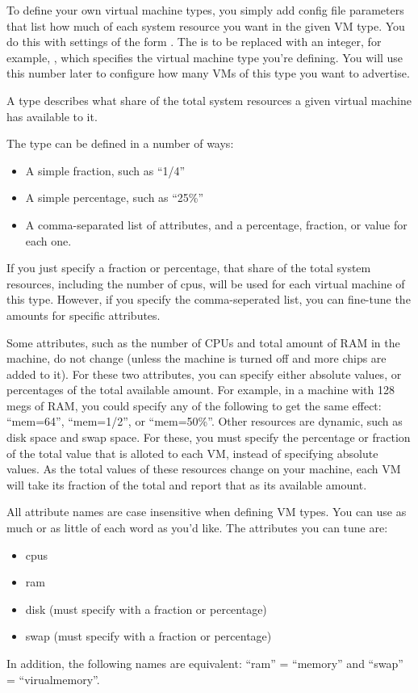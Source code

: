 To define your own virtual machine types, you simply add config file
parameters that list how much of each system resource you want in the
given VM type.  You do this with settings of the form
.
The  is to be replaced with an integer, for example, 
, which specifies the virtual 
machine type you're defining.
You will use this number later to configure how many VMs of this type
you want to advertise.

A type describes what share of the total system resources a given
virtual machine has available to it.

The type can be defined in a number of ways:
\begin{itemize}
  \item A simple fraction, such as ``1/4''
  \item A simple percentage, such as ``25\%''
  \item A comma-separated list of attributes, and a percentage,
	fraction, or value for each one.
\end{itemize}
If you just specify a fraction or percentage, that share of the total
system resources, including the number of cpus, will be used for each
virtual machine of this type.
However, if you specify the comma-seperated list, you can fine-tune
the amounts for specific attributes.

Some attributes, such as the number of CPUs and total amount of RAM in
the machine, do not change (unless the machine is turned off and more
chips are added to it).
For these two attributes, you can specify either absolute values, or
percentages of the total available amount.  
For example, in a machine with 128 megs of RAM, you could specify any
of the following to get the same effect: ``mem=64'', ``mem=1/2'', or
``mem=50\%''.
Other resources are dynamic, such as disk space and swap space.
For these, you must specify the percentage or fraction of the total
value that is alloted to each VM, instead of specifying absolute values.
As the total values of these resources change on your machine, each
VM will take its fraction of the total and report that as its
available amount.

All attribute names are case insensitive when defining VM types.
You can use as much or as little of each word as you'd like.
The attributes you can tune are:
\begin{itemize}
  \item cpus
  \item ram
  \item disk (must specify with a fraction or percentage)
  \item swap (must specify with a fraction or percentage)
\end{itemize}
In addition, the following names are equivalent: ``ram'' = ``memory''
and ``swap'' = ``virualmemory''.

